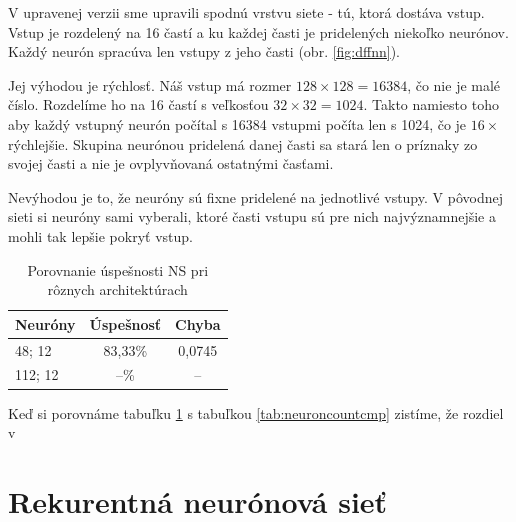V upravenej verzii sme upravili spodnú vrstvu siete - tú, ktorá dostáva vstup. Vstup je rozdelený na 16 častí a ku každej časti je pridelených niekoľko neurónov. Každý neurón spracúva len vstupy z jeho časti (obr. \ref{fig:dffnn}). 

Jej výhodou je rýchlosť. Náš vstup má rozmer $128\times 128 = 16384$, čo nie je malé číslo. Rozdelíme ho na 16 častí s veľkosťou $32\times 32 = 1024$. Takto namiesto toho aby každý vstupný neurón počítal s 16384 vstupmi počíta len s 1024, čo je $16\times$ rýchlejšie. Skupina neurónou pridelená danej časti sa stará len o príznaky zo svojej časti a nie je ovplyvňovaná ostatnými časťami. 

Nevýhodou je to, že neuróny sú fixne pridelené na jednotlivé vstupy. V pôvodnej sieti si neuróny sami vyberali, ktoré časti vstupu sú pre nich najvýznamnejšie a mohli tak lepšie pokryť vstup.

\begin{table}[hp]
\centering
\begin{tabular}{|l|c|c|}
\hline
\textbf{Neuróny} & \textbf{Úspešnosť} & \textbf{Chyba}\\ \hline
48; 12 & 83,33\% & 0,0745\\ \hline
112; 12 & --\% & --\\
\hline
\end{tabular}
\caption{Porovnanie úspešnosti NS pri rôznych architektúrach}
\label{tab:neuroncountcmp2}
\end{table}

Keď si porovnáme tabuľku \ref{tab:neuroncountcmp2} s tabuľkou \ref{tab:neuroncountcmp} zistíme, že rozdiel v 

\section{Rekurentná neurónová sieť}